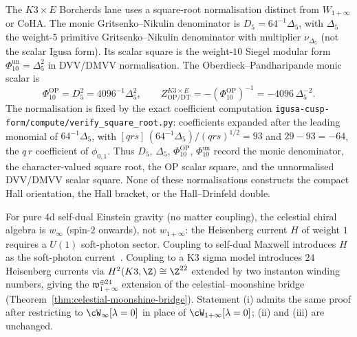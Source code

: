 \begin{remark}
\label{rem:igusa-square-normalisations}
The $K3\times E$ Borcherds lane uses a square-root normalisation
distinct from $W_{1+\infty}$ or CoHA. The monic
Gritsenko--Nikulin denominator is $D_5=64^{-1}\Delta_5$, with
$\Delta_5$ the weight-$5$ primitive Gritsenko--Nikulin denominator
with multiplier $\nu_{\Delta_5}$ (not the scalar Igusa form). Its
scalar square is the weight-$10$ Siegel modular form
$\Phi_{10}^{\mathrm{un}}=\Delta_5^2$ in DVV/DMVV normalisation.
The Oberdieck--Pandharipande monic scalar is
\[
 \Phi_{10}^{\mathrm{OP}}=D_5^2=4096^{-1}\Delta_5^2,
 \qquad
 Z_{\mathrm{OP/DT}}^{K3\times E}
 =-(\Phi_{10}^{\mathrm{OP}})^{-1}
 =-4096\,\Delta_5^{-2}.
\]
The normalisation is fixed by the exact coefficient computation
\texttt{igusa-cusp-form/compute/verify\_square\_root.py}:
coefficients expanded after the leading monomial of
$64^{-1}\Delta_5$, with
$[qrs]\,(64^{-1}\Delta_5)/(qrs)^{1/2}=93$ and $29-93=-64$, the
$q\,r$ coefficient of $\phi_{0,1}$. Thus $D_5$, $\Delta_5$,
$\Phi_{10}^{\mathrm{OP}}$, $\Phi_{10}^{\mathrm{un}}$ record the
monic denominator, the character-valued square root, the OP
scalar square, and the unnormalised DVV/DMVV scalar square. None
of these normalisations constructs the compact Hall orientation,
the Hall bracket, or the Hall--Drinfeld double.
\end{remark}

\begin{remark}
\label{rem:scope-of-one-plus}
For pure 4d self-dual Einstein gravity (no matter coupling), the
celestial chiral algebra is $w_\infty$ (spin-$2$ onwards), not
$w_{1+\infty}$: the Heisenberg current $H$ of weight $1$ requires
a $U(1)$ soft-photon sector. Coupling to self-dual Maxwell
introduces $H$ as the soft-photon
current~\cite{DonnayFotopoulosPasterskiTaylor21}. Coupling to a
K3 sigma model introduces $24$ Heisenberg currents via
$H^2(K3, \Z) \cong \Z^{22}$ extended by two instanton winding
numbers, giving the
$\mathfrak{w}_{1+\infty}^{\oplus 24}$ extension of the
celestial--moonshine bridge
(Theorem~\ref{thm:celestial-moonshine-bridge}). Statement (i)
admits the same proof after restricting to
$\cW_\infty[\lambda=0]$ in place of $\cW_{1+\infty}[\lambda=0]$;
(ii) and (iii) are unchanged.
\end{remark}

